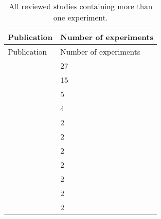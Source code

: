 \startrowcolors
\begin{longtable}{p{6cm}|l}
\caption{All reviewed studies containing more than one experiment.} \\
\hline
\rowcolor{white}
Publication & Number of experiments\\ \hline
\endfirsthead
\hline
\rowcolor{white}
Publication & Number of experiments\\ \hline
\endhead
\hline
\endfoot
\citet{Kapplinger2015MutationDB} & 27 \\
\citet{Tan2005MutationDB} & 15 \\
\citet{Abriel2001MutationDB} & 5 \\
\citet{Cheng2010MutationDB} & 4 \\
\citet{Ye2003MutationDB} & 2 \\
\citet{Watanabe2011bMutationDB} & 2 \\
\citet{Tan2006MutationDB} & 2 \\
\citet{Hu2015MutationDB} & 2 \\
\citet{Cheng2011MutationDB} & 2 \\
\citet{Calloe2011MutationDB} & 2 \\
\citet{An1998MutationDB} & 2 \\
\end{longtable}
